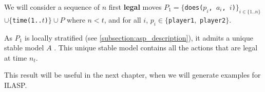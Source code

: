 \bigskip

We will consider a sequence of $n$ first \textbf{legal} moves $P_1=$\texttt{$\{$does($p_i$, $a_i$, $i$)$\}_{i\in \{1..n\}}$}$\cup\{$\texttt{time(1..$t$)}$\}\cup P$ where $n<t$, and for all $i$, $p_i\in \{$\texttt{player1}$,$ \texttt{player2}$\}$.

\bigskip

As $P_1$ is locally stratified (see \ref{subsection:asp_description}), it admits a unique stable model $A$ \citep{stable_semantics}. This unique stable model contains all the actions that are legal at time $n_t$.

\bigskip

This result will be useful in the next chapter, when we will generate examples for ILASP.